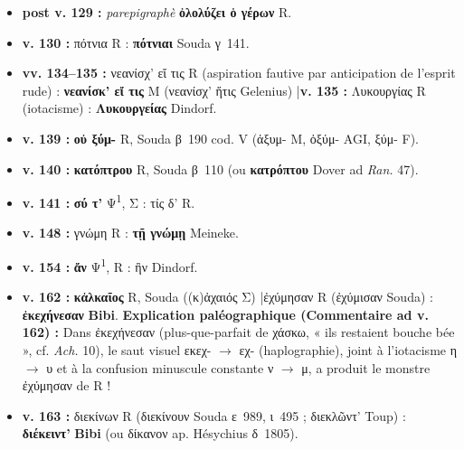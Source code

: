\documentclass[10pt, a4paper, twoside]{book}
\renewcommand{\_}{\origunderscore\penalty0\relax}
\providecommand{\italique}[1]{\emph{#1}}
\providecommand{\lecon}[1]{\textbf{#1}}
\providecommand{\Mon}{M}
\providecommand{\PsiUn}{\textgreek{Ψ}\textsuperscript{1}}
\providecommand{\espApp}{\hspace{0.5em}|\hspace{0.5em}}
\begin{document}
\begin{itemize}
\begin{itemize}
    \item \textbf{post v. 129 :} \italique{parepigraphè} \lecon{ὀλολύζει ὁ γέρων} R.
    \item \textbf{v. 130 :} πότνια R : \lecon{πότνιαι} Souda γ~141.
    \item \textbf{vv. 134–135 :} νεανίσχ' εἴ τις R (aspiration fautive par anticipation de l'esprit rude) : \lecon{νεανίσκ' εἴ τις} \Mon{} (νεανίσχ' ἥτις Gelenius) \espApp \textbf{v. 135 :} Λυκουργίας R (iotacisme) : \lecon{Λυκουργείας} Dindorf.
    \item \textbf{v. 139 :} \lecon{οὐ ξύμ-} R, Souda β~190 cod. V (ἀξυμ- M, ὀξύμ- AGI, ξύμ- F).
    \item \textbf{v. 140 :} \lecon{κατόπτρου} R, Souda β~110 (ou \lecon{κατρόπτου} Dover ad \italique{Ran.} 47).
    \item \textbf{v. 141 :} \lecon{σύ τ'} \PsiUn{}, Σ : τίς δ' R.
    \item \textbf{v. 148 :} γνώμη R : \lecon{τῇ γνώμῃ} Meineke.
    \item \textbf{v. 154 :} \lecon{ἄν} \PsiUn{}, R : ἢν Dindorf.
    \item \textbf{v. 162 :} \lecon{κἀλκαῖος} R, Souda ((κ)ἀχαιός Σ) \espApp ἐχύμησαν R (ἐχύμισαν Souda) : \lecon{ἐκεχήνεσαν} \lecon{Bibi}. \textbf{Explication paléographique (Commentaire ad v. 162) :} Dans ἐκεχήνεσαν (plus-que-parfait de χάσκω, « ils restaient bouche bée », cf. \italique{Ach.} 10), le saut visuel εκεχ- $\to$ εχ- (haplographie), joint à l'iotacisme η $\to$ υ et à la confusion minuscule constante ν $\to$ μ, a produit le monstre ἐχύμησαν de R !
    \item \textbf{v. 163 :} διεκίνων R (διεκίνουν Souda ε~989, ι~495 ; διεκλῶντ' Toup) : \lecon{διέκειντ'} \lecon{Bibi} (ou δίκανον ap. Hésychius δ~1805).
  \end{itemize}
\end{itemize}
\end{document}
